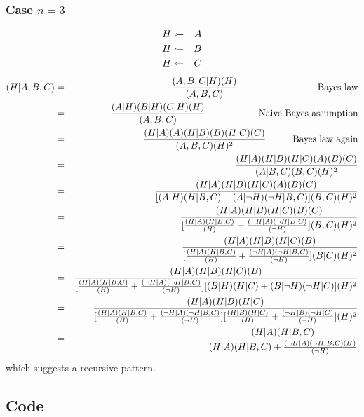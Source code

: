 \subsubsection{Case $n=3$}
\begin{eqnarray}
H &\leftarrowtriangle& A \nonumber \\
H &\leftarrowtriangle& B \nonumber \\
H &\leftarrowtriangle& C \nonumber
\end{eqnarray}
\begin{eqnarray}
(H|A,B,C) &=& \frac{ (A,B,C|H)(H) } { (A,B,C) } \tab\tab\tab \mbox{Bayes law} \nonumber \\
 &=& \frac{ (A|H)(B|H)(C|H)(H) }{ (A,B,C) } \tab\tab \mbox{Naive Bayes assumption} \nonumber \\
 &=& \frac{ (H|A)(A)(H|B)(B)(H|C)(C) }{ (A,B,C) (H)^2 } \tab \mbox{Bayes law again} \nonumber \\
 &=& \frac{ (H|A)(H|B)(H|C)(A)(B)(C) }{ (A|B,C)(B,C) (H)^2 } \nonumber \\
 &=& \frac{ (H|A)(H|B)(H|C)(A)(B)(C) }
          { [ (A|H)(H|B,C) + (A|\neg H)(\neg H|B,C) ] (B,C)(H)^2 } \nonumber \\
 &=& \frac{ (H|A)(H|B)(H|C)(B)(C) }
          { [ \frac{(H|A)(H|B,C)}{(H)} + \frac{(\neg H|A)(\neg H|B,C)}{(\neg H)} ] (B,C)(H)^2 } \nonumber \\
 &=& \frac{ (H|A)(H|B)(H|C)(B) }
          { [ \frac{(H|A)(H|B,C)}{(H)} + \frac{(\neg H|A)(\neg H|B,C)}{(\neg H)} ]
            (B|C)(H)^2 } \nonumber \\
 &=& \frac{ (H|A)(H|B)(H|C)(B) }
          { [ \frac{(H|A)(H|B,C)}{(H)} + \frac{(\neg H|A)(\neg H|B,C)}{(\neg H)} ]
            [(B|H)(H|C) + (B|\neg H)(\neg H|C)] (H)^2 } \nonumber \\
 &=& \frac{ (H|A)(H|B)(H|C) }
          { [ \frac{(H|A)(H|B,C)}{(H)} + \frac{(\neg H|A)(\neg H|B,C)}{(\neg H)} ]
            [ \frac{(H|B)(H|C)}{(H)} + \frac{(\neg H|B)(\neg H|C)}{(\neg H)}] (H)^2 } \nonumber \\
 &=& \frac{ (H|A)(H|B,C) }
          { (H|A)(H|B,C) + \frac{(\neg H|A)(\neg H|B,C)(H)}{(\neg H)} } \nonumber
\end{eqnarray}
which suggests a recursive pattern.

\subsection{Code}

